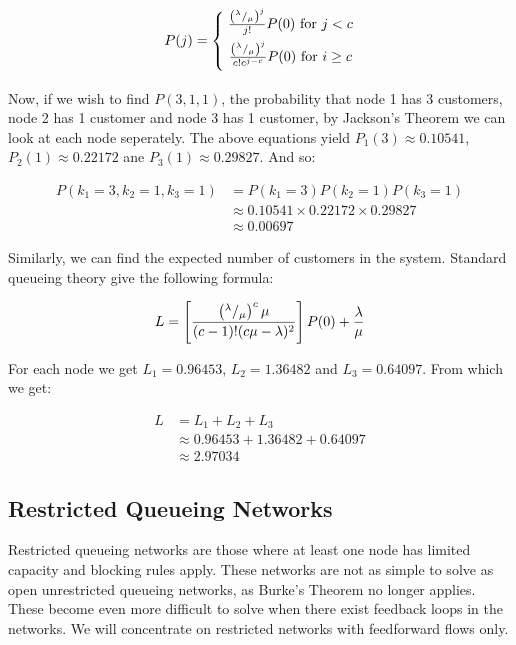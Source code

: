 \documentclass{article}
\begin{document}
\begin{equation}
P(j)=\left\{\;\begin{array}{@{}c@{}}
{\left({^\lambda / _\mu}\right)^j\over j!}P(0)\text{ for }j<c\\[2mm]
{\left({^\lambda / _\mu}\right)^j\over c!c^{j-c}}P(0)\text{ for }i\geq c\\[2mm]
\end{array}
\right.
\end{equation}

Now, if we wish to find $P(3, 1, 1)$, the probability that node 1 has 3 customers, node 2 has 1 customer and node 3 has 1 customer, by Jackson's Theorem we can look at each node seperately.
The above equations yield $P_1(3) \approx 0.10541$, $P_2(1) \approx 0.22172$ ane $P_3(1) \approx 0.29827$.
And so:

\begin{equation*}
    \begin{split}
    P( k_1 = 3, k_2 = 1, k_3 = 1 ) & = P(k_1 = 3) P(k_2 = 1) P(k_3 = 1) \\
    & \approx 0.10541 \times 0.22172 \times 0.29827 \\
    & \approx 0.00697
    \end{split}
\end{equation*}

Similarly, we can find the expected number of customers in the system. Standard queueing theory give the following formula:

\begin{equation}
    L = \left[ { \left( ^\lambda / _\mu \right)^c \mu \over (c - 1)! (c \mu - \lambda)^2 } \right] P(0) + \frac{\lambda}{\mu}
\end{equation}

For each node we get $L_1 = 0.96453$, $L_2 = 1.36482$ and $L_3 = 0.64097$.
From which we get:

\begin{equation*}
    \begin{split}
    L & = L_1 + L_2 + L_3\\
    & \approx 0.96453 + 1.36482 + 0.64097 \\
    & \approx 2.97034
    \end{split}
\end{equation*}


\subsection{Restricted Queueing Networks}
Restricted queueing networks are those where at least one node has limited capacity and blocking rules apply.
These networks are not as simple to solve as open unrestricted queueing networks, as Burke's Theorem no longer applies.
These become even more difficult to solve when there exist feedback loops in the networks.
We will concentrate on restricted networks with feedforward flows only.
\end{document}

